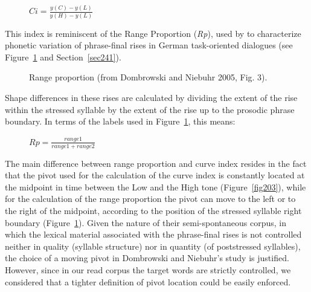 \begin{description}
   \item[] \(Ci=\frac{y(C)-y(L)}{y(H)-y(L)}\)
\end{description}

This index is reminiscent of the Range Proportion (\textit{Rp}), used by \citet{dombrowski2005acoustic} to characterize phonetic variation of phrase-final rises in German task-oriented dialogues (see Figure~\ref{fig205} and Section~\ref{sec241}). 

\begin{figure}
\centering
{}
\caption{Range proportion (from Dombrowski and Niebuhr 2005, Fig. 3).}
\label{fig205}\end{figure}

Shape differences in these rises are calculated by dividing the extent of the rise within the stressed syllable by the extent of the rise up to the prosodic phrase boundary. In terms of the labels used in Figure~\ref{fig205}, this means:

\begin{description}
   \item[] \(Rp=\frac{range1}{range1+range2}\)
\end{description}

The main difference between range proportion and curve index resides in the fact that the pivot used for the calculation of the curve index is constantly located at the midpoint in time between the Low and the High tone (Figure~\ref{fig203}), while for the calculation of the range proportion the pivot can move to the left or to the right of the midpoint, according to the position of the stressed syllable right boundary (Figure~\ref{fig205}). Given the nature of their semi-spontaneous corpus, in which the lexical material associated with the phrase-final rises is not controlled neither in quality (syllable structure) nor in quantity (of poststressed syllables), the choice of a moving pivot in Dombrowski and Niebuhr's study is justified. However, since in our read corpus the target words are strictly controlled, we considered that a tighter definition of pivot location could be easily enforced.

